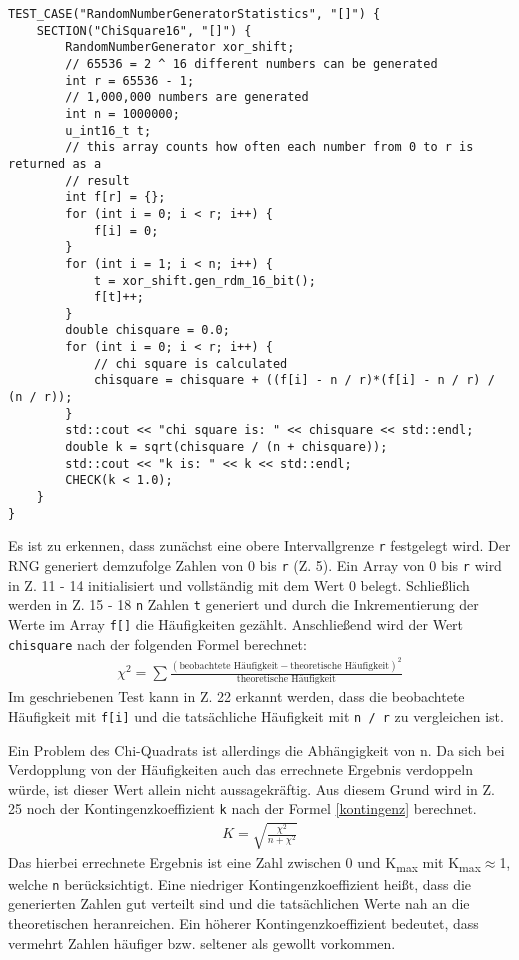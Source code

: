 \documentclass[../review_3.tex]{subfiles}
\begin{document}
\begin{lstlisting}[caption= {Chi-Quadrat-Test}, label = chisquaretest]
TEST_CASE("RandomNumberGeneratorStatistics", "[]") {
    SECTION("ChiSquare16", "[]") {
        RandomNumberGenerator xor_shift;
        // 65536 = 2 ^ 16 different numbers can be generated
        int r = 65536 - 1;
        // 1,000,000 numbers are generated
        int n = 1000000;
        u_int16_t t;
        // this array counts how often each number from 0 to r is returned as a
        // result
        int f[r] = {};
        for (int i = 0; i < r; i++) {
            f[i] = 0;
        }
        for (int i = 1; i < n; i++) {
            t = xor_shift.gen_rdm_16_bit();
            f[t]++;
        }
        double chisquare = 0.0;
        for (int i = 0; i < r; i++) {
            // chi square is calculated
            chisquare = chisquare + ((f[i] - n / r)*(f[i] - n / r) / (n / r));
        }
        std::cout << "chi square is: " << chisquare << std::endl;
        double k = sqrt(chisquare / (n + chisquare));
        std::cout << "k is: " << k << std::endl;
        CHECK(k < 1.0);
    }
}\end{lstlisting}

Es ist zu erkennen, dass zunächst eine obere Intervallgrenze  \texttt{r} festgelegt wird. Der RNG generiert demzufolge Zahlen von 0 bis \texttt{r} (Z. 5). Ein Array von 0 bis \texttt{r} wird in Z. 11 - 14 initialisiert und vollständig mit dem Wert 0 belegt. Schließlich werden in Z. 15 - 18 \texttt{n} Zahlen \texttt{t} generiert und durch die Inkrementierung der Werte im Array \texttt{f[]} die Häufigkeiten gezählt. Anschließend wird der Wert \texttt{chisquare} nach der folgenden Formel berechnet:
\begin{align} \label {chisquare}
    \chi^2 = \sum \frac{(\text{beobachtete Häufigkeit}-\text{theoretische Häufigkeit})^2}{\text{theoretische Häufigkeit}}   
\end{align}
Im geschriebenen Test kann in Z. 22 erkannt werden, dass die beobachtete Häufigkeit mit \texttt{f[i]} und die tatsächliche Häufigkeit mit \texttt{n / r} zu vergleichen ist.

Ein Problem des Chi-Quadrats ist allerdings die Abhängigkeit von n. Da sich bei Verdopplung von der Häufigkeiten auch das errechnete Ergebnis verdoppeln würde, ist dieser Wert allein nicht aussagekräftig. Aus diesem Grund wird in Z. 25 noch der Kontingenzkoeffizient \texttt{k} nach der Formel \ref{kontingenz} berechnet.
\begin{align} \label{kontingenz}
    K = \sqrt{\frac{\chi^2}{n+\chi^2}}    
\end{align}
Das hierbei errechnete Ergebnis ist eine Zahl zwischen 0 und K\textsubscript{max} mit K\textsubscript{max}$\approx$1, welche \texttt{n} berücksichtigt. Eine niedriger Kontingenzkoeffizient heißt, dass die generierten Zahlen gut verteilt sind und die tatsächlichen Werte nah an die theoretischen heranreichen. Ein höherer Kontingenzkoeffizient bedeutet, dass vermehrt Zahlen häufiger bzw. seltener als gewollt vorkommen.
\end{document}
